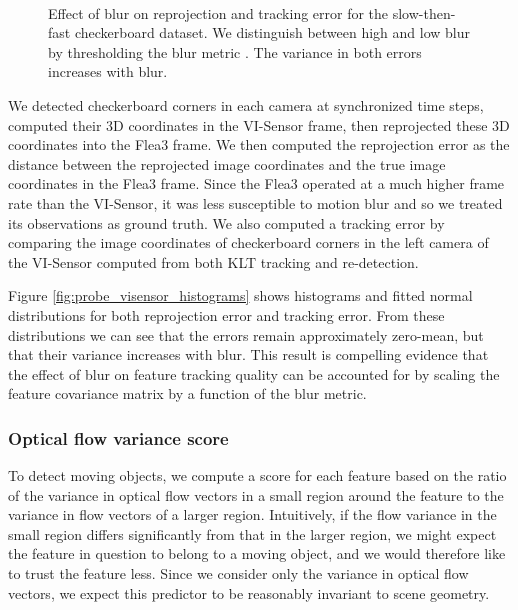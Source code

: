 \begin{figure*}
    \centering
    ~
    \caption{Effect of blur on reprojection and tracking error for the slow-then-fast checkerboard dataset. We distinguish between high and low blur by thresholding the blur metric \cite{Anonymous:Ngi3VEEU}. The variance in both errors increases with blur.}
    \label{fig:visensor_histograms}
\end{figure*}

We detected checkerboard corners in each camera at synchronized time steps, computed their 3D coordinates in the VI-Sensor frame, then reprojected these 3D coordinates into the Flea3 frame.
We then computed the reprojection error as the distance between the reprojected image coordinates and the true image coordinates in the Flea3 frame.
Since the Flea3 operated at a much higher frame rate than the VI-Sensor, it was less susceptible to motion blur and so we treated its observations as ground truth.
We also computed a tracking error by comparing the image coordinates of checkerboard corners in the left camera of the VI-Sensor computed from both KLT tracking \cite{Lucas:1981uw} and re-detection.

Figure \ref{fig:probe_visensor_histograms} shows histograms and fitted normal distributions for both reprojection error and tracking error.
From these distributions we can see that the errors remain approximately zero-mean, but that their variance increases with blur.
This result is compelling evidence that the effect of blur on feature tracking quality can be accounted for by scaling the feature covariance matrix by a function of the blur metric.


\subsubsection{Optical flow variance score}
To detect moving objects, we compute a score for each feature based on the ratio of the variance in optical flow vectors in a small region around the feature to the variance in flow vectors of a larger region.
Intuitively, if the flow variance in the small region differs significantly from that in the larger region, we might expect the feature in question to belong to a moving object, and we would therefore like to trust the feature less.
Since we consider only the variance in optical flow vectors, we expect this predictor to be reasonably invariant to scene geometry.

